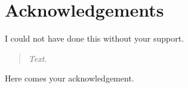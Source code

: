 
% 
\chapter*{Acknowledgements}
 I could not have done this without your support.

 \begin{quote}
\emph{Text.}\vfill{}
\end{quote}


Here comes your acknowledgement.
% 

